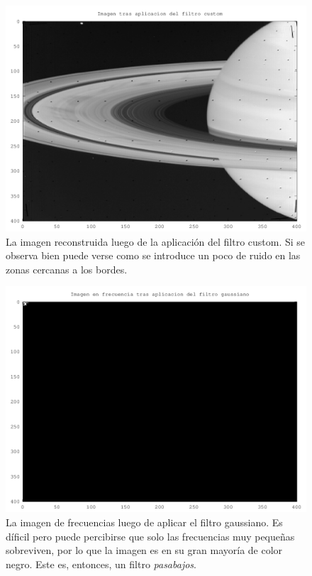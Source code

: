 \documentclass[twocolumn,a4paper,10pt]{article}
\begin{document}
\begin{figure}[H]
        \includegraphics[width=\linewidth]{../images/customFilter.png}
        \caption{La imagen reconstruida luego de la aplicaci\'on del filtro custom. Si se observa bien puede verse como se introduce un poco de ruido 
        en las zonas cercanas a los bordes.}
        \label{fig:customFilter}
\end{figure}

\begin{figure}[H]
        \includegraphics[width=\linewidth]{../images/gaussFilterFreq.png}
        \caption{La imagen de frecuencias luego de aplicar el filtro gaussiano. Es d\'ificil pero puede percibirse que solo las frecuencias muy pequeñas 
        sobreviven, por lo que la imagen es en su gran mayoría de color negro. Este es, entonces, un filtro \textit{pasabajos}.}
        \label{fig:gaussFilterFrequency}
\end{figure}
\end{document}
